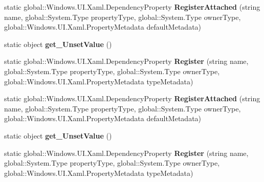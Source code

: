 \begin{DoxyCompactItemize}
static global\+::\+Windows.\+U\+I.\+Xaml.\+Dependency\+Property {\bfseries Register\+Attached} (string name, global\+::\+System.\+Type property\+Type, global\+::\+System.\+Type owner\+Type, global\+::\+Windows.\+U\+I.\+Xaml.\+Property\+Metadata default\+Metadata)
\item 
\mbox{\label{class_windows_1_1_u_i_1_1_xaml_1_1_dependency_property_a1c894733a17dba561f7ed84012ccd20f}} 
static object {\bfseries get\+\_\+\+Unset\+Value} ()
\item 
\mbox{\label{class_windows_1_1_u_i_1_1_xaml_1_1_dependency_property_afcde08990c00c5ed3c61a20868e08594}} 
static global\+::\+Windows.\+U\+I.\+Xaml.\+Dependency\+Property {\bfseries Register} (string name, global\+::\+System.\+Type property\+Type, global\+::\+System.\+Type owner\+Type, global\+::\+Windows.\+U\+I.\+Xaml.\+Property\+Metadata type\+Metadata)
\item 
\mbox{\label{class_windows_1_1_u_i_1_1_xaml_1_1_dependency_property_a6343063f73c71c10100255da1dcf03a2}} 
static global\+::\+Windows.\+U\+I.\+Xaml.\+Dependency\+Property {\bfseries Register\+Attached} (string name, global\+::\+System.\+Type property\+Type, global\+::\+System.\+Type owner\+Type, global\+::\+Windows.\+U\+I.\+Xaml.\+Property\+Metadata default\+Metadata)
\item 
\mbox{\label{class_windows_1_1_u_i_1_1_xaml_1_1_dependency_property_a1c894733a17dba561f7ed84012ccd20f}} 
static object {\bfseries get\+\_\+\+Unset\+Value} ()
\item 
\mbox{\label{class_windows_1_1_u_i_1_1_xaml_1_1_dependency_property_afcde08990c00c5ed3c61a20868e08594}} 
static global\+::\+Windows.\+U\+I.\+Xaml.\+Dependency\+Property {\bfseries Register} (string name, global\+::\+System.\+Type property\+Type, global\+::\+System.\+Type owner\+Type, global\+::\+Windows.\+U\+I.\+Xaml.\+Property\+Metadata type\+Metadata)
\item 
\mbox{\label{class_windows_1_1_u_i_1_1_xaml_1_1_dependency_property_a6343063f73c71c10100255da1dcf03a2}} 

\end{DoxyCompactItemize}
